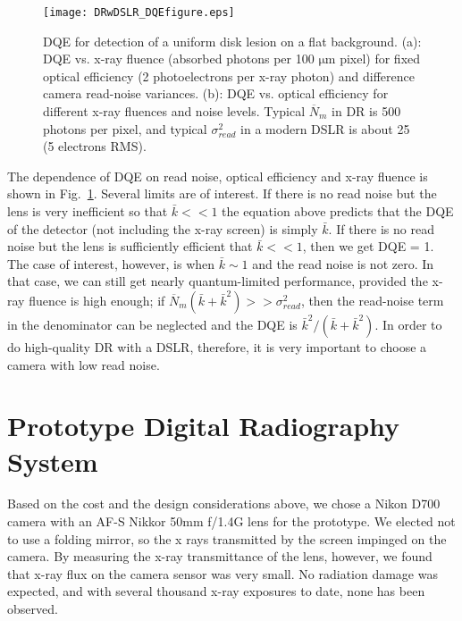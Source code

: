 \begin{figure}
\centering
\texttt{[image: DRwDSLR\_DQEfigure.eps]}
\caption{DQE for detection of a uniform disk lesion on a flat background. (a): DQE vs. x-ray fluence (absorbed photons per 100 $\mathrm{\mu m}$ pixel) for fixed optical efficiency (2 photoelectrons per x-ray photon) and difference camera read-noise variances. (b): DQE vs. optical efficiency for different x-ray fluences and noise levels. Typical $\overline{N}_m$ in DR is 500 photons per pixel, and typical $\sigma_{read}^2$ in a modern DSLR is about 25 (5 electrons RMS).}
\label{fig:DQE}
\end{figure}

The dependence of DQE on read noise, optical efficiency and x-ray fluence is shown in Fig.~\ref{fig:DQE}. Several limits are of interest. If there is no read noise but the lens is very inefficient so that $\bar{k} << 1$ the equation above predicts that the DQE of the detector (not including the x-ray screen) is simply $\bar{k}$.  If there is no read noise but the lens is sufficiently efficient that $\bar{k} << 1$, then we get DQE = 1. The case of interest, however, is when $\bar{k} \sim 1$ and the read noise is not zero. In that case, we can still get nearly quantum-limited performance, provided the x-ray fluence is high enough; if $\overline{N}_m(\bar{k}+\bar{k}^2) >> \sigma_{read}^2$, then the read-noise term in the denominator can be neglected and the DQE is $\bar{k}^2/(\bar{k}+\bar{k}^2)$. In order to do high-quality DR with a DSLR, therefore, it is very important to choose a camera with low read noise.

\section{Prototype Digital Radiography System}
Based on the cost and the design considerations above, we chose a Nikon D700 camera with an AF-S Nikkor 50mm f/1.4G lens for the prototype.  We elected not to use a folding mirror, so the x rays transmitted by the screen impinged on the camera. By measuring the x-ray transmittance of the lens, however, we found that x-ray flux on the camera sensor was very small. No radiation damage was expected, and with several thousand x-ray exposures to date, none has been observed.

